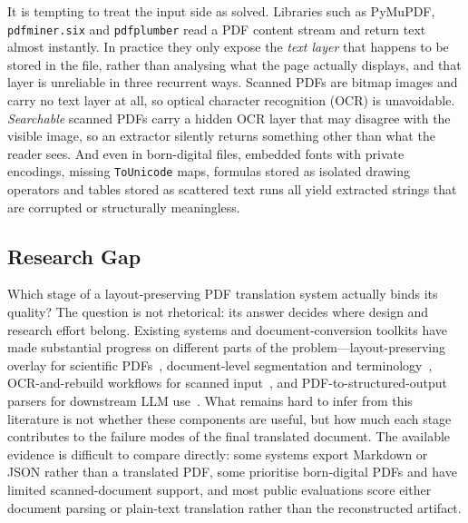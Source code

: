 It is tempting to treat the input side as solved. Libraries such as PyMuPDF,
\texttt{pdfminer.six} and \texttt{pdfplumber} read a PDF content stream and
return text almost instantly. In practice they only expose the \emph{text
layer} that happens to be stored in the file, rather than analysing what the
page actually displays, and that layer is unreliable in three recurrent ways.
Scanned PDFs are bitmap images and carry no text layer at all, so optical
character recognition (OCR) is unavoidable. \emph{Searchable} scanned PDFs
carry a hidden OCR layer that may disagree with the visible image, so an
extractor silently returns something other than what the reader sees. And even
in born-digital files, embedded fonts with private encodings, missing
\texttt{ToUnicode} maps, formulas stored as isolated drawing operators and
tables stored as scattered text runs all yield extracted strings that are
corrupted or structurally meaningless.

\subsection{Research Gap}

Which stage of a layout-preserving PDF translation system actually binds its
quality? The question is not rhetorical: its answer decides where design and
research effort belong. Existing systems and document-conversion toolkits have
made substantial progress on different parts of the problem---layout-preserving
overlay for scientific PDFs~\citep{pdf2zh}, document-level segmentation and
terminology~\citep{docutranslate}, OCR-and-rebuild workflows for scanned
input~\citep{retain-pdf}, and PDF-to-structured-output parsers for downstream
LLM use~\citep{docling,marker,mineru,olmocr}. What remains hard to infer from
this literature is not whether these components are useful, but how much each
stage contributes to the failure modes of the final translated document. The
available evidence is difficult to compare directly: some systems export
Markdown or JSON rather than a translated PDF, some prioritise born-digital PDFs
and have limited scanned-document support, and most public evaluations score
either document parsing or plain-text translation rather than the reconstructed
artifact.

